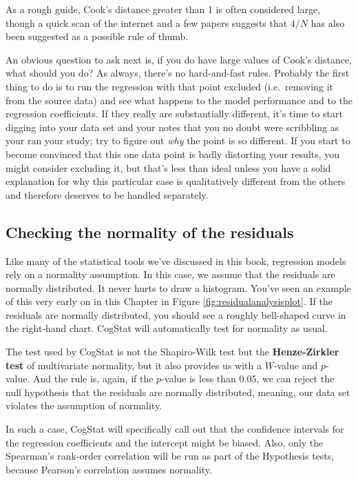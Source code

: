 \documentclass[
  11pt,
  a4paper,
  twoside,symmetric,openright]{book}
\theoremstyle{break}
\theoremstyle{break}
\begin{document}
As a rough guide, Cook's distance greater than 1 is often considered large, though a quick scan of the internet and a few papers suggests that \(4/N\) has also been suggested as a possible rule of thumb.

An obvious question to ask next is, if you do have large values of Cook's distance, what should you do? As always, there's no hard-and-fast rules. Probably the first thing to do is to run the regression with that point excluded (i.e.~removing it from the source data) and see what happens to the model performance and to the regression coefficients. If they really are substantially different, it's time to start digging into your data set and your notes that you no doubt were scribbling as your ran your study; try to figure out \emph{why} the point is so different. If you start to become convinced that this one data point is badly distorting your results, you might consider excluding it, but that's less than ideal unless you have a solid explanation for why this particular case is qualitatively different from the others and therefore deserves to be handled separately.

\subsection{Checking the normality of the residuals}\label{regressionnormality}

Like many of the statistical tools we've discussed in this book, regression models rely on a normality assumption. In this case, we assume that the residuals are normally distributed. It never hurts to draw a histogram. You've seen an example of this very early on in this Chapter in Figure \ref{fig:residualanalysisplot}. If the residuals are normally distributed, you should see a roughly bell-shaped curve in the right-hand chart. CogStat will automatically test for normality as usual.

The test used by CogStat is not the Shapiro-Wilk test but the \textbf{Henze-Zirkler test} of multivariate normality, but it also provides us with a \(W\)-value and \(p\)-value. And the rule is, again, if the \(p\)-value is less than 0.05, we can reject the null hypothesis that the residuals are normally distributed, meaning, our data set violates the assumption of normality.

In such a case, CogStat will specifically call out that the confidence intervals for the regression coefficients and the intercept might be biased. Also, only the Spearman's rank-order correlation will be run as part of the Hypothesis tests, because Pearson's correlation assumes normality.
\end{document}
